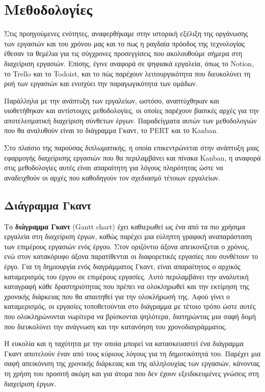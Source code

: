     \section{Μεθοδολογίες} \label{sec:methodologies}
        Στις προηγούμενες ενότητες, αναφερθήκαμε στην ιστορική εξέλιξη της οργάνωσης των εργασιών και του χρόνου μας και το πως η ραγδαία πρόοδος της τεχνολογίας έθεσαν τα θεμέλια για τις σύγχρονες προσεγγίσεις που ακολουθούμε σήμερα στη διαχείριση εργασιών. Επίσης, έγινε αναφορά σε ψηφιακά εργαλεία, όπως το Notion, το Trello και το Todoist, και το πώς παρέχουν λειτουργικότητα που διευκολύνει τη ροή των εργασιών και ενισχύει την παραγωγικότητα των ομάδων.

        Παράλληλα με την ανάπτυξη των εργαλείων, ωστόσο, αναπτύχθηκαν και υιοθετήθηκαν και αντίστοιχες μεθοδολογίες, οι οποίες παρέχουν βασικές αρχές για την αποτελεσματική διαχείριση σύνθετων έργων. Παραδείγματα αυτών των μεθοδολογιών που θα αναλυθούν είναι το διάγραμμα Γκαντ, το PERT και το Kanban.

        Στο πλαίσιο της παρούσας διπλωματικής, η οποία επικεντρώνεται στην ανάπτυξη μιας εφαρμογής διαχείρισης εργασιών που θα περιλαμβάνει και πίνακα Kanban, η αναφορά στις μεθοδολογίες αυτές είναι απαραίτητη για λόγους πληρότητας ώστε να αναδειχθούν οι αρχές που καθοδηγούν τον σχεδιασμό τέτοιων εργαλείων.

        \subsection{Διάγραμμα Γκαντ}
            Το \textbf{διάγραμμα Γκαντ} (Gantt chart) έχει καθιερωθεί ως ένα από τα πιο χρήσιμα εργαλεία στη διαχείριση έργων, καθώς παρέχει μια εύληπτη γραφική αναπαράσταση των επιμέρους εργασιών ενός έργου. Στον οριζόντιο άξονα απεικονίζεται ο χρόνος, ενώ στον κατακόρυφο άξονα παρατίθενται οι διαφορετικές εργασίες που συνθέτουν το έργο.  Για τη δημιουργία ενός διαγράμματος Γκαντ, είναι απαραίτητος ο αρχικός καταμερισμός του έργου σε επιμέρους εργασίες. Αυτό περιλαμβάνει την αναλυτική καταγραφή κάθε δραστηριότητας που πρέπει να ολοκληρωθεί και την εκτίμηση της χρονικής διάρκειας που θα απαιτηθεί για την ολοκλήρωσή της. Αφού γίνει ο καταμερισμός, οι εργασίες τοποθετούνται στο διάγραμμα με τέτοιο τρόπο ώστε αυτές που ολοκληρώνονται νωρίτερα να βρίσκονται ψηλότερα, διατηρώντας μια σαφή δομή που διευκολύνει την ανάγνωση και την κατανόηση του χρονοδιαγράμματος.

            Η ευκολία και η ταχύτητα με την οποία μπορεί να κατασκευαστεί ένα διάγραμμα Γκαντ αποτελούν έναν από τους κύριους λόγους για τη δημοτικότητά του. Παρέχει μια σαφή απεικόνιση της χρονικής διάρκειας και της αλληλουχίας των εργασιών, κάνοντας τη χρήση του προσιτή ακόμη και για άτομα που δεν έχουν εξειδικευμένες γνώσεις στη διαχείριση έργων.

